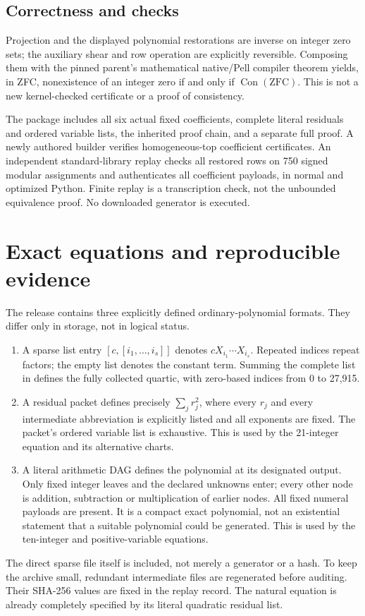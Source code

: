\documentclass[11pt]{article}
\begin{document}
\subsection{Correctness and checks}
Projection and the displayed polynomial restorations are inverse on
integer zero sets; the auxiliary shear and row operation are explicitly
reversible. Composing them with the pinned parent's mathematical
native/Pell compiler theorem yields, in ZFC, nonexistence of an integer
zero if and only if $\operatorname{Con}(\mathrm{ZFC})$. This is not a
new kernel-checked certificate or a proof of consistency.

The package includes all six actual fixed coefficients, complete
literal residuals and ordered variable lists, the inherited proof
chain, and a separate full proof. A newly authored builder verifies
homogeneous-top coefficient certificates. An independent standard-library
replay checks all restored rows on 750 signed modular assignments and
authenticates all coefficient payloads, in normal and optimized Python.
Finite replay is a transcription check, not the unbounded equivalence
proof. No downloaded generator is executed.


\section{Exact equations and reproducible evidence}
The release contains three explicitly defined ordinary-polynomial formats.
They differ only in storage, not in logical status.
\begin{enumerate}
\item A sparse list entry $[c,[i_1,\ldots,i_s]]$ denotes
$cX_{i_1}\cdots X_{i_s}$. Repeated indices repeat factors; the empty list
denotes the constant term. Summing the complete list in
 defines the fully collected
quartic, with zero-based indices from 0 to 27,915.
\item A residual packet defines precisely $\sum_jr_j^2$, where every
$r_j$ and every intermediate abbreviation is explicitly listed and all
exponents are fixed. The packet's ordered variable list is exhaustive.
This is used by the 21-integer equation and its alternative charts.
\item A literal arithmetic DAG defines the polynomial at its designated
output. Only fixed integer leaves and the declared unknowns enter; every
other node is addition, subtraction or multiplication of earlier nodes.
All fixed numeral payloads are present. It is a compact exact polynomial,
not an existential statement that a suitable polynomial could be generated.
This is used by the ten-integer and positive-variable equations.
\end{enumerate}
The direct sparse file itself is included, not merely a generator or a hash.
To keep the archive small, redundant intermediate files are
regenerated before auditing. Their SHA-256 values are fixed in the replay
record. The natural equation is already completely specified by its literal
quadratic residual list.
\end{document}
